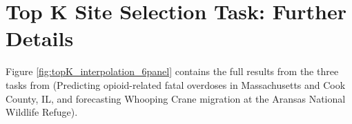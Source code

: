 \section{Top K Site Selection Task: Further Details}
\label{app:topK}
Figure \ref{fig:topK_interpolation_6panel} contains the full results from the three tasks from \citet{heuton2025decisionaware} (Predicting opioid-related fatal overdoses in Massachusetts and Cook County, IL, and forecasting Whooping Crane migration at the Aransas National Wildlife Refuge).


